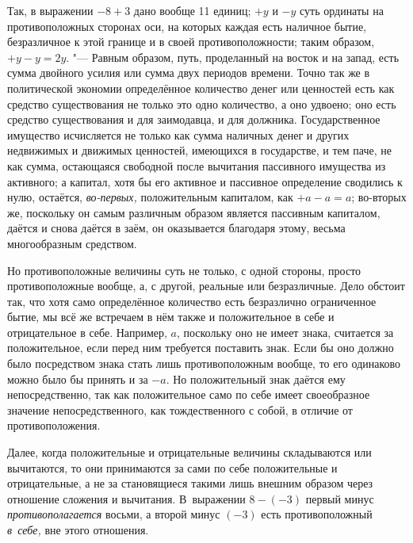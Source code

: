 Так, в выражении $-8+3$ дано вообще 11 единиц; $+y$ и $-y$ суть
ординаты на противоположных сторонах оси, на которых каждая есть наличное
бытие, безразличное к этой границе и в своей противоположности; таким
образом, $+y-y=2y$. "--- Равным образом, путь,
проделанный на восток и на запад, есть
сумма двойного усилия или сумма двух периодов времени. Точно так же в
политической экономии определённое количество денег или ценностей есть как
средство существования не только это одно количество, а оно удвоено; оно
есть средство существования и для заимодавца, и для должника.
Государственное имущество исчисляется не только как сумма наличных денег и
других недвижимых и движимых ценностей, имеющихся в государстве, и тем
паче, не как сумма, остающаяся свободной после вычитания пассивного
имущества из активного; а капитал, хотя бы его активное и пассивное
определение сводились к нулю, остаётся,
{\em во-первых,} положительным капиталом, как $+a-a=a$;
во-вторых же, поскольку он самым различным образом является пассивным
капиталом, даётся и снова даётся в заём, он оказывается благодаря этому,
весьма многообразным средством.

Но противоположные величины суть не только, с одной стороны, просто
противоположные вообще, а, с другой, реальные или безразличные. Дело
обстоит так, что хотя само определённое количество есть безразлично
ограниченное бытие, мы всё же встречаем в нём также и положительное в себе
и отрицательное в себе. Например, $a$, поскольку
оно не имеет знака, считается за положительное, если перед ним требуется
поставить знак. Если бы оно должно было посредством знака стать лишь
противоположным вообще, то его одинаково можно было бы принять и за
$-a$. Но положительный знак даётся ему
непосредственно, так как положительное само по себе имеет своеобразное
значение непосредственного, как тождественного с собой, в отличие от
противоположения.

Далее, когда положительные и отрицательные величины складываются или
вычитаются, то они принимаются за сами по себе положительные и
отрицательные, а не за становящиеся такими лишь внешним образом через
отношение сложения и вычитания. В~выражении $8-(-3)$ первый минус
{\em противополагается} восьми, а второй минус $(-3)$
есть противоположный {\em в~себе,} вне этого отношения.

